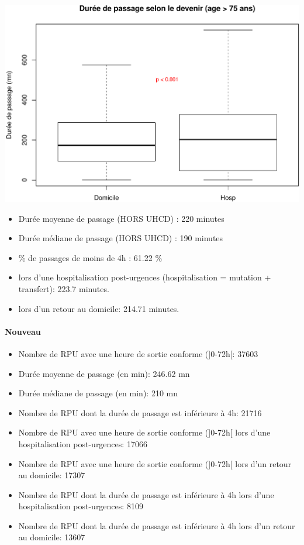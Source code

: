 \documentclass[]{article}
\begin{document}
\includegraphics{rapport2014_V4_files/figure-latex/duree_passage_75-1.pdf}

\begin{itemize}
\itemsep1pt\parskip0pt
\item
  Durée moyenne de passage (HORS UHCD) : 220 minutes
\item
  Durée médiane de passage (HORS UHCD) : 190 minutes
\item
  \% de passages de moins de 4h : 61.22 \%
\item
  lors d'une hospitalisation post-urgences (hospitalisation = mutation +
  transfert): 223.7 minutes.
\item
  lors d'un retour au domicile: 214.71 minutes.
\end{itemize}

\paragraph{Nouveau}\label{nouveau}

\begin{itemize}
\item
  Nombre de RPU avec une heure de sortie conforme ({]}0-72h{[}: 37603
\item
  Durée moyenne de passage (en min): 246.62 mn
\item
  Durée médiane de passage (en min): 210 mn
\item
  Nombre de RPU dont la durée de passage est inférieure à 4h: 21716
\item
  Nombre de RPU avec une heure de sortie conforme ({]}0-72h{[} lors
  d'une hospitalisation post-urgences: 17066
\item
  Nombre de RPU avec une heure de sortie conforme ({]}0-72h{[} lors d'un
  retour au domicile: 17307
\item
  Nombre de RPU dont la durée de passage est inférieure à 4h lors d'une
  hospitalisation post-urgences: 8109
\item
  Nombre de RPU dont la durée de passage est inférieure à 4h lors d'un
  retour au domicile: 13607
\end{itemize}
\end{document}
